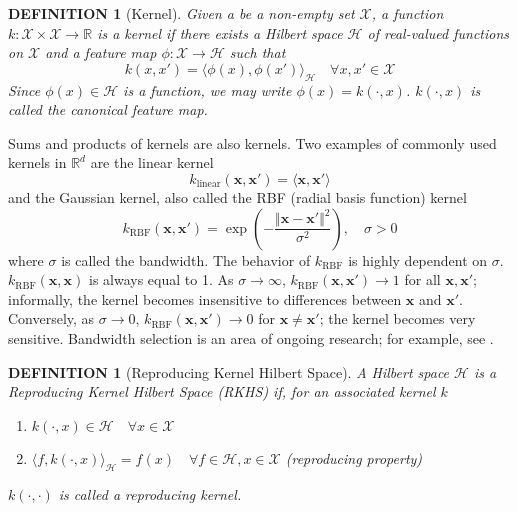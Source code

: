 \documentclass[a4paper,11pt]{article}
\newtheorem{definition}[theorem]{DEFINITION}
\begin{document}
\begin{definition}[Kernel]
    Given a be a non-empty set $\mathcal{X}$, a function $k: \mathcal{X} \times \mathcal{X} \rightarrow \mathbb{R}$ is a kernel if there exists a Hilbert space $\mathcal{H}$ of real-valued functions on $\mathcal{X}$ and a feature map $\phi: \mathcal{X} \rightarrow \mathcal{H}$ such that $$ k(x, x') = \langle \phi(x), \phi(x') \rangle_{\mathcal{H}} \quad \forall x, x' \in \mathcal{X} $$
    Since $\phi(x) \in \mathcal{H}$ is a function, we may write $\phi(x)=k(\cdot, x)$. $k(\cdot, x)$ is called the canonical feature map.
\end{definition}
Sums and products of kernels are also kernels. Two examples of commonly used kernels in $\mathbb{R}^{d}$ are the linear kernel
\begin{equation}
    k_{\text{linear}}(\mathbf{x}, \mathbf{x}') = \langle \mathbf{x}, \mathbf{x}' \rangle
    \label{eq:linear_kernel}
\end{equation}
and the Gaussian kernel, also called the RBF (radial basis function) kernel
\begin{equation}
    k_{\text{RBF}}(\mathbf{x}, \mathbf{x}') = \exp{\left( -\frac{\Vert \mathbf{x}-\mathbf{x}' \Vert^{2}}{\sigma^{2}} \right)}, \quad \sigma > 0
    \label{eq:gaussian_kernel}
\end{equation}
where $\sigma$ is called the bandwidth. The behavior of $k_{\text{RBF}}$ is highly dependent on $\sigma$. $k_{\text{RBF}}(\mathbf{x}, \mathbf{x})$ is always equal to 1. As $\sigma\rightarrow\infty$, $k_{\text{RBF}}(\mathbf{x}, \mathbf{x}') \rightarrow 1$ for all $\mathbf{x}, \mathbf{x}'$; informally, the kernel becomes insensitive to differences between $\mathbf{x}$ and $\mathbf{x}'$. Conversely, as $\sigma\rightarrow 0$, $k_{\text{RBF}}(\mathbf{x}, \mathbf{x}') \rightarrow 0$ for $\mathbf{x} \neq \mathbf{x}'$; the kernel becomes very sensitive. Bandwidth selection is an area of ongoing research; for example, see \cite{sutherland_generative_2019}.

\begin{definition}[Reproducing Kernel Hilbert Space]
    A Hilbert space $\mathcal{H}$ is a Reproducing Kernel Hilbert Space (RKHS) if, for an associated kernel $k$
    \begin{enumerate}
        \item $k(\cdot, x) \in \mathcal{H} \quad \forall x \in \mathcal{X}$
        \item $\langle f, k(\cdot, x) \rangle_{\mathcal{H}} = f(x) \quad \forall f \in \mathcal{H}, x \in \mathcal{X} $ (reproducing property)
    \end{enumerate}
    $k(\cdot, \cdot)$ is called a reproducing kernel.
\end{definition}
\end{document}
